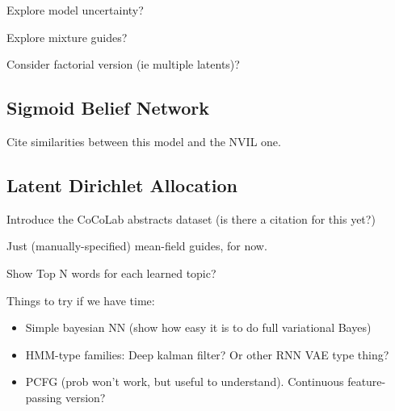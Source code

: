 Explore model uncertainty?

Explore mixture guides?

Consider factorial version (ie multiple latents)?


\subsection{Sigmoid Belief Network}
\label{sec:results_sbn}

Cite similarities between this model and the NVIL one.


\subsection{Latent Dirichlet Allocation}
\label{sec:results_lda}

Introduce the CoCoLab abstracts dataset (is there a citation for this yet?)

Just (manually-specified) mean-field guides, for now.

Show Top N words for each learned topic?


Things to try if we have time:
\begin{itemize}
\item{Simple bayesian NN (show how easy it is to do full variational Bayes)}
\item{HMM-type families: Deep kalman filter? Or other RNN VAE type thing?}
\item{PCFG (prob won’t work, but useful to understand). Continuous feature-passing version?}
\end{itemize}

